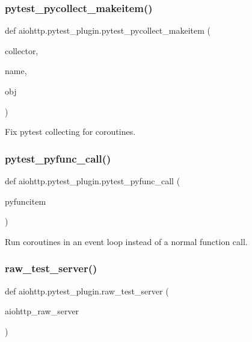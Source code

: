 \subsubsection{\texorpdfstring{pytest\+\_\+pycollect\+\_\+makeitem()}{pytest\_pycollect\_makeitem()}}
{\footnotesize\ttfamily def aiohttp.\+pytest\+\_\+plugin.\+pytest\+\_\+pycollect\+\_\+makeitem (\begin{DoxyParamCaption}\item[{}]{collector,  }\item[{}]{name,  }\item[{}]{obj }\end{DoxyParamCaption})}

\begin{DoxyVerb}Fix pytest collecting for coroutines.
\end{DoxyVerb}
 \mbox{\label{namespaceaiohttp_1_1pytest__plugin_af300895004fd19b88e2b19b698bf48b7}} 
\subsubsection{\texorpdfstring{pytest\+\_\+pyfunc\+\_\+call()}{pytest\_pyfunc\_call()}}
{\footnotesize\ttfamily def aiohttp.\+pytest\+\_\+plugin.\+pytest\+\_\+pyfunc\+\_\+call (\begin{DoxyParamCaption}\item[{}]{pyfuncitem }\end{DoxyParamCaption})}

\begin{DoxyVerb}Run coroutines in an event loop instead of a normal function call.
\end{DoxyVerb}
 \mbox{\label{namespaceaiohttp_1_1pytest__plugin_a58cb78466b179efba0f8422657e5388b}} 
\subsubsection{\texorpdfstring{raw\+\_\+test\+\_\+server()}{raw\_test\_server()}}
{\footnotesize\ttfamily def aiohttp.\+pytest\+\_\+plugin.\+raw\+\_\+test\+\_\+server (\begin{DoxyParamCaption}\item[{}]{aiohttp\+\_\+raw\+\_\+server }\end{DoxyParamCaption})}

